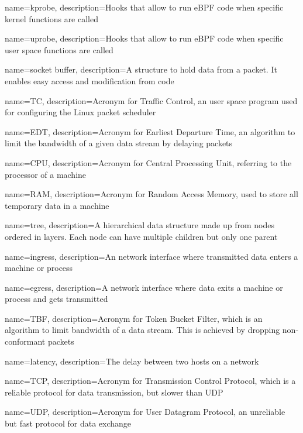 {
    name=kprobe,
    description={Hooks that allow to run eBPF code when specific kernel functions are called}
}

{
    name=uprobe,
    description={Hooks that allow to run eBPF code when specific user space functions are called}
}

{
    name=socket buffer,
    description={A structure to hold data from a packet. It enables easy access and modification from code}
}

{
    name=TC,
    description={Acronym for Traffic Control, an user space program used for configuring the Linux packet scheduler}
}

{
    name=EDT,
    description={Acronym for Earliest Departure Time, an algorithm to limit the bandwidth of a given data stream by delaying packets}
}

{
    name=CPU,
    description={Acronym for Central Processing Unit, referring to the processor of a machine}
}

{
    name=RAM,
    description={Acronym for Random Access Memory, used to store all temporary data in a machine}
}

{
    name=tree,
    description={A hierarchical data structure made up from nodes ordered in layers. Each node can have multiple children but only one parent}
}

{
    name=ingress,
    description={An network interface where transmitted data enters a machine or process}
}

{
    name=egress,
    description={A network interface where data exits a machine or process and gets transmitted}
}

{
    name=TBF,
    description={Acronym for Token Bucket Filter, which is an algorithm to limit bandwidth of a data stream. This is achieved by dropping non-conformant packets}
}

{
    name=latency,
    description={The delay between two hosts on a network}
}

{
    name=TCP,
    description={Acronym for Transmission Control Protocol, which is a reliable protocol for data transmission, but slower than UDP}
}

{
    name=UDP,
    description={Acronym for User Datagram Protocol, an unreliable but fast protocol for data exchange}
}

